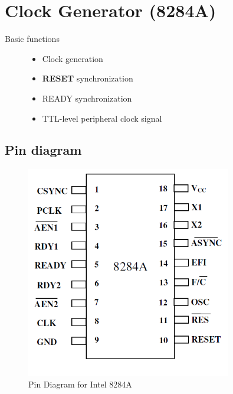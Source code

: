 \section{Clock Generator (8284A)}
\begin{description}
  \item[Basic functions]
  \begin{itemize}
    \item Clock generation
    \item \textbf{RESET} synchronization
    \item READY synchronization
    \item TTL-level peripheral clock signal
  \end{itemize}
\end{description}
\newpage
\subsection{Pin diagram}
\begin{figure}[h!]
    \centering
    \includegraphics[width = 0.8\textwidth]{./figures/8284A.png}
    \caption{Pin Diagram for Intel 8284A}
    \label{fig:bl}
\end{figure}


